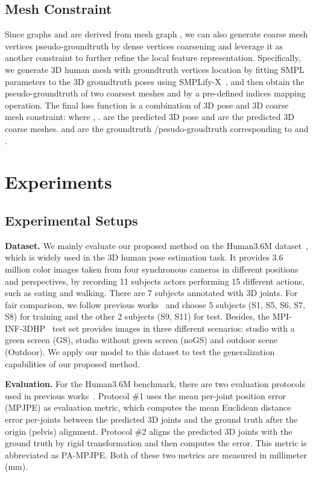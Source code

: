\documentclass{bmvc2k}
\begin{document}
\subsection{Mesh Constraint}
Since graphs  and  are derived from mesh graph , we can also generate coarse mesh vertices pseudo-groundtruth by dense vertices coarsening and leverage it as another constraint to further refine the local feature representation. Specifically, we generate 3D human mesh  with groundtruth vertices location by fitting SMPL parameters to the 3D groundtruth poses using SMPLify-X~\cite{bogo2016keep}, and then obtain the pseudo-groundtruth of two coarsest meshes   and   by a pre-defined indices mapping operation. The final loss function is a combination of 3D pose and 3D coarse mesh constraint:
where , .  are the predicted 3D pose and   are the predicted 3D coarse meshes.   and  are the groundtruth /pesudo-groudtruth corresponding to  and .
\section{Experiments}
\label{sec:exp}
\subsection{Experimental Setups}
{\bf Dataset.}  We mainly evaluate our proposed method on the Human3.6M dataset~\cite{ionescu2013human3}, which is widely used in the 3D human pose estimation task. It provides 3.6 million color images taken from four synchronous cameras in different positions and perspectives, by
recording 11 subjects actors performing 15 different actions, such as eating and walking. There are 7 subjects annotated with 3D joints. For fair comparison, we follow previous works~\cite{2017simple,zhao2019semantic,2021Graph} and choose 5 subjects (S1, S5, S6, S7, S8) for training and the other 2 subjects (S9, S11) for test. Besides, the MPI-INF-3DHP~\cite{mehta2017monocular} test set  provides images in three different scenarios: studio with
a green screen (GS), studio without green screen (noGS) and outdoor scene (Outdoor). We apply our model to this dataset to test the generalization capabilities of our proposed method.



{\bf Evaluation.} For the Human3.6M benchmark, there are two evaluation protocols used in previous works~\cite{2017simple,zhao2019semantic,2021Graph}. Protocol \#1 uses the mean per-joint position error (MPJPE) as evaluation metric, which
computes the mean Euclidean distance error per-joints between the predicted 3D joints and the ground truth after the origin (pelvis) alignment. Protocol \#2 aligns the predicted 3D joints with the ground truth by rigid transformation and then computes the error. This metric is abbreviated as PA-MPJPE. Both of these two metrics are measured in millimeter (mm).
\end{document}
